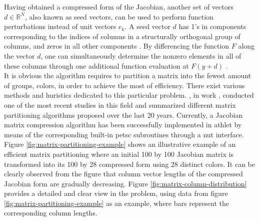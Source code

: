 

Having obtained a compressed form of the Jacobian, another set of vectors $d \in \mathbb{R}^{N}$, also known as seed vectors, can be used to perform function perturbations instead of unit vectors $e_{k}$. A seed vector $d$ has 1’s in components corresponding to the indices of columns in a structurally orthogonal group of columns, and zeros in all other components \cite{gebremedhin2005color}. By differencing the function $F$ along the vector $d$, one can simultaneously determine the nonzero elements in all of these columns through one additional function evaluation at $F(y+d)$ \cite{gebremedhin2005color}.\\


It is obvious the algorithm requires to partition a matrix into the fewest amount of groups, colors, in order to achieve the most of efficiency. There exist various methods and huristics dedicated to this particular problem. \citeauthor{gebremedhin2005color}, in work \cite{gebremedhin2005color}, conducted one of the most recent studies in this field and summarized different matrix partitioning algorithms proposed over the last 20 years. Currently, a Jacobian matrix compression algorithm has been successfully implemented in \acrshort{athlet} by means of the corresponding built-in \acrshort{petsc} subroutines through a \acrshort{nut} interface.\\


Figure \ref{fig:matrix-partitioning-example} shows an illustrative example of an efficient matrix partitioning where an initial 100 by 100 Jacobian matrix is transformed into its 100 by 28 compressed form using 28 distinct colors. It can be clearly observed from the figure that column vector lengths of the compressed Jacobian form are gradually decreasing. Figure \ref{fig:matrix-column-distribution} provides a detailed and clear view in the problem, using data from figure \ref{fig:matrix-partitioning-example} as an example, where bars represent the corresponding column lengths.\\


